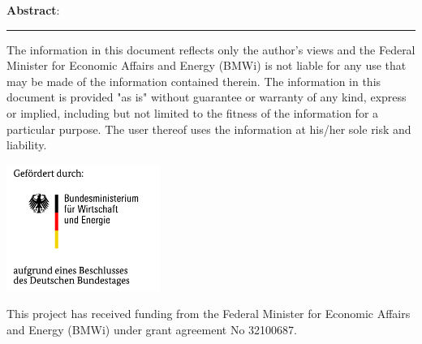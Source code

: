 \vspace{1ex}
\textbf{Abstract}: \deliverableAbstract

\rule{16cm}{1pt}

{\scriptsize
\noindent
The information in this document reflects only the author's views and the Federal Minister for Economic Affairs and Energy (BMWi) is not liable for any use that may be made of the information contained therein. The information in this document is provided "as is" without guarantee or warranty of any kind, express or implied, including but not limited to the fitness of the information for a particular purpose. The user thereof uses the information at his/her sole risk and liability.}
\begin{center}
\includegraphics[width=5cm]{logo/BMWi_logo_de.jpg}
\end{center}

\begin{center}
{\footnotesize
This project has received funding from the Federal Minister for Economic Affairs and Energy (BMWi) under grant agreement No  32100687.}
\end{center}
